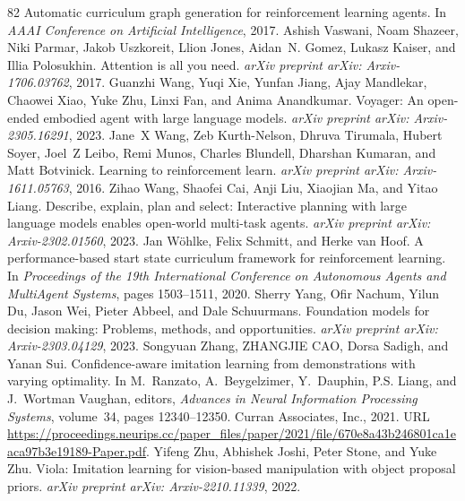\documentclass{article}
\begin{document}
\begin{thebibliography}{82}
\newblock Automatic curriculum graph generation for reinforcement learning agents.
\newblock In \emph{AAAI Conference on Artificial Intelligence}, 2017.
Ashish Vaswani, Noam Shazeer, Niki Parmar, Jakob Uszkoreit, Llion Jones, Aidan~N. Gomez, Lukasz Kaiser, and Illia Polosukhin.
\newblock Attention is all you need.
\newblock \emph{arXiv preprint arXiv: Arxiv-1706.03762}, 2017.
Guanzhi Wang, Yuqi Xie, Yunfan Jiang, Ajay Mandlekar, Chaowei Xiao, Yuke Zhu, Linxi Fan, and Anima Anandkumar.
\newblock Voyager: An open-ended embodied agent with large language models.
\newblock \emph{arXiv preprint arXiv: Arxiv-2305.16291}, 2023{}.
Jane~X Wang, Zeb Kurth-Nelson, Dhruva Tirumala, Hubert Soyer, Joel~Z Leibo, Remi Munos, Charles Blundell, Dharshan Kumaran, and Matt Botvinick.
\newblock Learning to reinforcement learn.
\newblock \emph{arXiv preprint arXiv: Arxiv-1611.05763}, 2016.
Zihao Wang, Shaofei Cai, Anji Liu, Xiaojian Ma, and Yitao Liang.
\newblock Describe, explain, plan and select: Interactive planning with large language models enables open-world multi-task agents.
\newblock \emph{arXiv preprint arXiv: Arxiv-2302.01560}, 2023{}.
Jan W{\"o}hlke, Felix Schmitt, and Herke van Hoof.
\newblock A performance-based start state curriculum framework for reinforcement learning.
\newblock In \emph{Proceedings of the 19th International Conference on Autonomous Agents and MultiAgent Systems}, pages 1503--1511, 2020.
Sherry Yang, Ofir Nachum, Yilun Du, Jason Wei, Pieter Abbeel, and Dale Schuurmans.
\newblock Foundation models for decision making: Problems, methods, and opportunities.
\newblock \emph{arXiv preprint arXiv: Arxiv-2303.04129}, 2023.
Songyuan Zhang, ZHANGJIE CAO, Dorsa Sadigh, and Yanan Sui.
\newblock Confidence-aware imitation learning from demonstrations with varying optimality.
\newblock In M.~Ranzato, A.~Beygelzimer, Y.~Dauphin, P.S. Liang, and J.~Wortman Vaughan, editors, \emph{Advances in Neural Information Processing Systems}, volume~34, pages 12340--12350. Curran Associates, Inc., 2021.
\newblock URL \url{https://proceedings.neurips.cc/paper_files/paper/2021/file/670e8a43b246801ca1eaca97b3e19189-Paper.pdf}.
Yifeng Zhu, Abhishek Joshi, Peter Stone, and Yuke Zhu.
\newblock Viola: Imitation learning for vision-based manipulation with object proposal priors.
\newblock \emph{arXiv preprint arXiv: Arxiv-2210.11339}, 2022.
\end{thebibliography}
\end{document}
